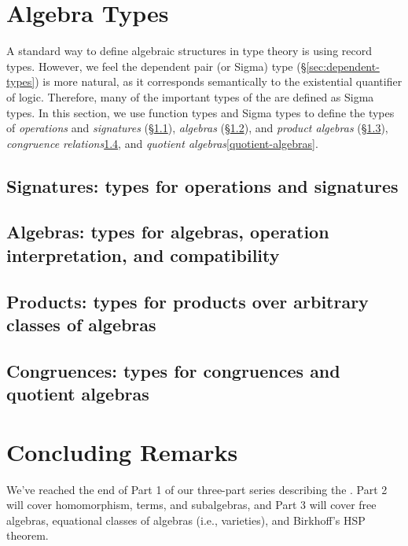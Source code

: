 \documentclass[a4paper,UKenglish,cleveref,autoref,thm-restate,12pt]{../lipics-v2021-wjd}
\begin{document}
\section{Algebra Types}\label{sec:algebra-types}
A standard way to define algebraic structures in type theory is using record types.  However, we feel the dependent pair (or Sigma) type (\S\ref{sec:dependent-types}) is more natural, as it corresponds semantically to the existential quantifier of logic. Therefore, many of the important types of the \ualib are defined as Sigma types. In this section, we use function types and Sigma types to define the types of \emph{operations} and \emph{signatures} (\S\ref{sec:oper-sign}), \emph{algebras} (\S\ref{sec:algebras}), and \emph{product algebras} (\S\ref{sec:product-algebras}), \emph{congruence relations}\ref{congruences}, and \emph{quotient algebras}\ref{quotient-algebras}.

\subsection{Signatures: types for operations and signatures}\label{sec:oper-sign}


\subsection{Algebras: types for algebras, operation interpretation, and compatibility}\label{sec:algebras}


\subsection{Products: types for products over arbitrary classes of algebras}\label{sec:product-algebras}


\subsection{Congruences: types for congruences and quotient algebras}\label{congruences}




\section{Concluding Remarks}\label{sec:concluding-remarks}
We've reached the end of Part 1 of our three-part series describing the \agdaualib.  Part 2 will cover homomorphism, terms, and subalgebras, and Part 3 will cover free algebras, equational classes of algebras (i.e., varieties), and Birkhoff's HSP theorem.
\end{document}

